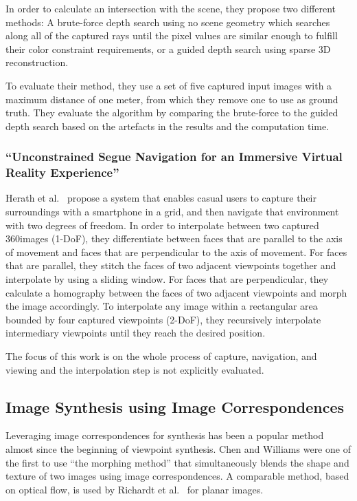 In order to calculate an intersection with the scene, they propose two different methods: A brute-force depth search using no scene geometry which searches along all of the captured rays until the pixel values are similar enough to fulfill their color constraint requirements, or a guided depth search using sparse 3D reconstruction.

To evaluate their method, they use a set of five captured input images with a maximum distance of one meter, from which they remove one to use as ground truth. They evaluate the algorithm by comparing the brute-force to the guided depth search based on the artefacts in the results and the computation time.

\subsubsection{``Unconstrained Segue Navigation for an Immersive Virtual Reality Experience'' \cite{segue}}
Herath et al.\ \cite{segue} propose a system that enables casual users to capture their surroundings with a smartphone in a grid, and then navigate that environment with two degrees of freedom. In order to interpolate between two captured 360\degree images (1-DoF), they differentiate between faces that are parallel to the axis of movement and faces that are perpendicular to the axis of movement. For faces that are parallel, they stitch the faces of two adjacent viewpoints together and interpolate by using a sliding window. For faces that are perpendicular, they calculate a homography between the faces of two adjacent viewpoints and morph the image accordingly. To interpolate any image within a rectangular area bounded by four captured viewpoints (2-DoF), they recursively interpolate intermediary viewpoints until they reach the desired position.

The focus of this work is on the whole process of capture, navigation, and viewing and the interpolation step is not explicitly evaluated.

\subsection{Image Synthesis using Image Correspondences}
Leveraging image correspondences for synthesis has been a popular method almost since the beginning of viewpoint synthesis. Chen and Williams \cite{apple} were one of the first to use ``the morphing method'' that simultaneously blends the shape and texture of two images using image correspondences. A comparable method, based on optical flow, is used by Richardt et al.\ \cite{megastereo} for planar images.

